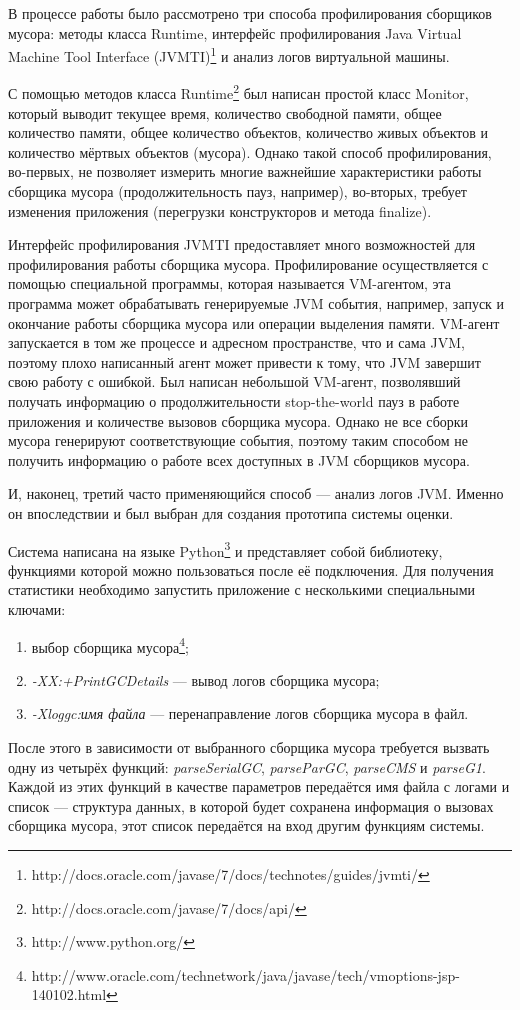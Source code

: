\documentclass[12pt,a4paper]{article}
\begin{document}
В процессе работы было рассмотрено три способа профилирования сборщиков мусора:
методы класса Runtime, интерфейс профилирования Java Virtual Machine Tool Interface
(JVMTI)\footnote{http://docs.oracle.com/javase/7/docs/technotes/guides/jvmti/} и анализ
логов виртуальной машины.

С помощью методов класса Runtime\footnote{http://docs.oracle.com/javase/7/docs/api/}
был написан простой класс Monitor, который выводит текущее время, количество свободной памяти,
общее количество памяти, общее количество объектов, количество живых объектов и 
количество мёртвых объектов (мусора). Однако такой способ профилирования, во-первых,
не позволяет измерить многие важнейшие характеристики работы сборщика мусора (продолжительность
пауз, например), во-вторых, требует изменения приложения (перегрузки конструкторов и 
метода finalize).

Интерфейс профилирования JVMTI предоставляет много возможностей для профилирования
работы сборщика мусора. Профилирование осуществляется с помощью специальной программы,
которая называется VM-агентом, эта программа может обрабатывать генерируемые JVM
события, например, запуск и окончание работы сборщика мусора или операции выделения
памяти. VM-агент запускается в том же процессе и адресном пространстве, что и сама
JVM, поэтому плохо написанный агент может привести к тому, что JVM завершит свою
работу с ошибкой. Был написан небольшой VM-агент, позволявший получать информацию
о продолжительности stop-the-world пауз в работе приложения и количестве вызовов сборщика
мусора. Однако не все сборки мусора генерируют соответствующие события, поэтому таким способом не получить
информацию о работе всех доступных в JVM сборщиков мусора.

И, наконец, третий часто применяющийся способ --- анализ логов JVM. Именно он впоследствии
и был выбран для создания прототипа системы оценки.

Система написана на языке Python\footnote{http://www.python.org/} и представляет собой
библиотеку, функциями которой можно пользоваться после её подключения. Для получения
статистики необходимо запустить приложение с несколькими специальными ключами: 
\begin{enumerate}
\item выбор сборщика мусора\footnote{http://www.oracle.com/technetwork/java/javase/tech/vmoptions-jsp-140102.html};
\item \textit{-XX:+PrintGCDetails} --- вывод логов сборщика мусора;
\item \textit{-Xloggc:имя файла} --- перенаправление логов сборщика мусора в файл.
\end{enumerate}
После этого в зависимости от выбранного сборщика мусора требуется вызвать одну из
четырёх функций: \textit{parseSerialGC}, \textit{parseParGC}, \textit{parseCMS}
и \textit{parseG1}. Каждой из этих функций в качестве параметров передаётся имя файла 
с логами и список --- структура данных, в которой будет сохранена информация о
вызовах сборщика мусора, этот список передаётся на вход другим функциям системы.
\end{document}
